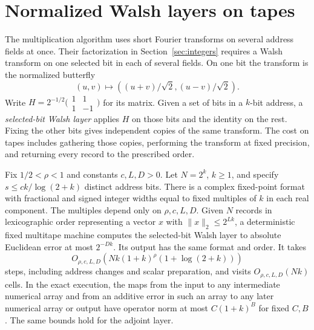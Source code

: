 \section{Normalized Walsh layers on tapes}\label{sec:tape-walsh}

The multiplication algorithm uses short Fourier transforms on several
address fields at once. Their factorization in Section~\ref{sec:integers}
requires a Walsh transform on one selected bit in each of several
fields. On one bit the transform is the normalized butterfly
\[
        (u,v)\longmapsto ((u+v)/\sqrt2,(u-v)/\sqrt2).
\]
Write \(H=2^{-1/2}\bigl(\begin{smallmatrix}1&1\\1&-1\end{smallmatrix}\bigr)\)
for its matrix. Given a set of bits in a \(k\)-bit address, a
\emph{selected-bit Walsh layer} applies \(H\) on those bits and the
identity on the rest. Fixing the other bits gives independent copies
of the same transform. The cost on tapes includes gathering those
copies, performing the transform at fixed precision, and returning
every record to the prescribed order.

\begin{lemma}\label{lem:tape-walsh}
Fix \(1/2<\rho<1\) and constants \(c,L,D>0\).
Let \(N=2^k\), \(k\ge1\), and specify
\(s\le ck/\log(2+k)\) distinct address bits. There is a complex
fixed-point format with fractional and signed integer widths equal to
fixed multiples of \(k\) in each real component. The multiples depend
only on \(\rho,c,L,D\). Given \(N\) records in lexicographic order
representing a vector \(x\) with \(\|x\|_2\le2^{Lk}\), a deterministic
fixed multitape machine computes the selected-bit Walsh layer to
absolute Euclidean error at most \(2^{-Dk}\). Its output has the
same format and order. It takes
\[
 O_{\rho,c,L,D}\!\left(Nk(1+k)^\rho(1+\log(2+k))\right)
\]
steps, including address changes and scalar preparation, and visits
\(O_{\rho,c,L,D}(Nk)\) cells. In the exact execution, the maps from the
input to any intermediate numerical array and from an additive error
in such an array to any later numerical array or output have operator
norm at most \(C(1+k)^B\) for fixed \(C,B\). The same bounds hold for
the adjoint layer.
\end{lemma}

